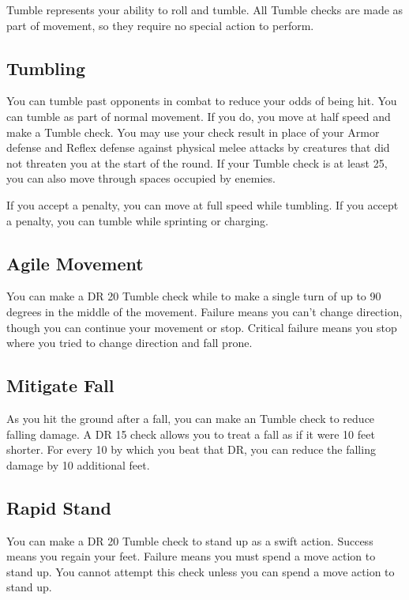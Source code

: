         Tumble represents your ability to roll and tumble. All Tumble checks are made as part of movement, so they require no special action to perform.

    \subsection{Tumbling}

        You can tumble past opponents in combat to reduce your odds of being hit. You can tumble as part of normal movement. If you do, you move at half speed and make a Tumble check. You may use your check result in place of your Armor defense and Reflex defense against physical melee attacks by creatures that did not threaten you at the start of the round. If your Tumble check is at least 25, you can also move through spaces occupied by enemies.

        If you accept a  penalty, you can move at full speed while tumbling. If you accept a  penalty, you can tumble while sprinting or charging.

    \subsection{Agile Movement}
        You can make a DR 20 Tumble check while  to make a single turn of up to 90 degrees in the middle of the movement. Failure means you can't change direction, though you can continue your movement or stop. Critical failure means you stop where you tried to change direction and fall prone.

    \subsection{Mitigate Fall}
        As you hit the ground after a fall, you can make an Tumble check to reduce falling damage. A DR 15 check allows you to treat a fall as if it were 10 feet shorter. For every 10 by which you beat that DR, you can reduce the falling damage by 10 additional feet.

    \subsection{Rapid Stand}
        You can make a DR 20 Tumble check to stand up as a swift action. Success means you regain your feet. Failure means you must spend a move action to stand up. You cannot attempt this check unless you can spend a move action to stand up.

